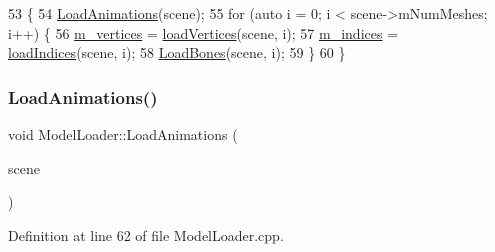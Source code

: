 \begin{DoxyCode}
53 \{
54     \mbox{\hyperlink{class_model_loader_afebdf188f92f87cdcefdee2b4b474727}{LoadAnimations}}(scene);
55     \textcolor{keywordflow}{for} (\textcolor{keyword}{auto} i = 0; i < scene->mNumMeshes; i++) \{
56         \mbox{\hyperlink{class_model_loader_ac87b9662dae9c00b140bc90c30c088ee}{m\_vertices}} = \mbox{\hyperlink{class_model_loader_a90e1f853324d4aee05ba5db140aa974d}{loadVertices}}(scene, i);
57         \mbox{\hyperlink{class_model_loader_a6d63371db7677b60c2c000f23c7fb8f6}{m\_indices}} = \mbox{\hyperlink{class_model_loader_aade9d7c2c0a8a13800700ee3b4b930ef}{loadIndices}}(scene, i);
58         \mbox{\hyperlink{class_model_loader_a77713e17f817861d8b6b3b166248abe7}{LoadBones}}(scene, i);
59     \}
60 \}
\end{DoxyCode}
\mbox{\label{class_model_loader_afebdf188f92f87cdcefdee2b4b474727}} 
\subsubsection{\texorpdfstring{Load\+Animations()}{LoadAnimations()}}
{\footnotesize\ttfamily void Model\+Loader\+::\+Load\+Animations (\begin{DoxyParamCaption}\item[{const ai\+Scene $\ast$}]{scene }\end{DoxyParamCaption})\hspace{0.3cm}{\ttfamily [private]}}



Definition at line 62 of file Model\+Loader.\+cpp.



